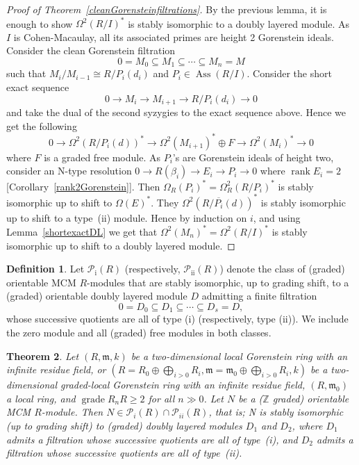 \documentclass[11pt,letterpaper]{amsart}
\newcommand{\seq}{\subseteq}
\newcommand{\x}{\xrightarrow{}}
\DeclareMathOperator{\Ass}{Ass}
\DeclareMathOperator{\gr}{grade}
\DeclareMathOperator{\rank}{rank}
\theoremstyle{plain}
\newtheorem{thm}{Theorem}[section]
\theoremstyle{definition}
\newtheorem{defi}[thm]{Definition}
\theoremstyle{remark}
\begin{document}
\begin{proof}[Proof of Theorem~\ref{cleanGorensteinfiltrations}] By the previous lemma, it is enough to show $\Omega^2(R/I)^*$ is stably isomorphic to a doubly layered module. As $I$ is Cohen-Macaulay, all its associated primes are height 2 Gorenstein ideals. Consider the clean Gorenstein filtration $$0=M_0\seq M_1\seq\cdots\seq M_n=M$$ such that $M_{i}/M_{i-1}\cong R/P_i(d_i)$ and $P_i\in\Ass(R/I)$. Consider the short exact sequence $$0\x M_{i}\x M_{i+1}\x R/P_i(d_i)\x 0$$ and take the dual of the second syzygies to the exact sequence above. Hence we get the following $$0\x\Omega^2(R/P_i(d))^*\x \Omega^2(M_{i+1})^*\oplus F\x\Omega^2(M_i)^*\x 0$$ where $F$ is a graded free module. As $P_i$'s are Gorenstein ideals of height two, consider an N-type resolution $0\x R(\beta_i)\x E_i\x P_i\x 0$ where $\rank E_i=2$[Corollary~\ref{rank2Gorenstein}]. Then $\Omega_R(P_i)^*=\Omega^2_R(R/P_i)^*$ is stably isomorphic up to shift to $\Omega(E)^*$. They $\Omega^2(R/\overline{P_i}(d))^*$ is stably isomorphic up to shift to a type~(ii) module.  Hence by induction on $i$, and using Lemma~\ref{shortexactDL} we get that $\Omega^2(M_n)^*=\Omega^2(R/I)^*$ is stably isomorphic up to shift to a doubly layered module.     
\end{proof}

\begin{defi}
    Let $\mathcal P_{\mathrm{i}}(R)$ (respectively,
$\mathcal P_{\mathrm{ii}}(R)$) denote the class of (graded) orientable
MCM $R$-modules that are stably isomorphic, up to grading
shift, to a (graded) orientable doubly layered module $D$ admitting a finite filtration
\[
0=D_0\subseteq D_1\subseteq\cdots\subseteq D_s=D,
\]
whose successive quotients are all of type (i)
(respectively, type (ii)). We include the zero module
and all (graded) free modules in both classes.
\end{defi}

\begin{thm}\label{2dimDL}
Let $(R,\mathfrak m, k)$ be a two-dimensional local Gorenstein ring with an infinite residue field, or $(R=R_0\oplus\bigoplus_{i>0}R_i,\mathfrak m=\mathfrak m_0\oplus\bigoplus_{i>0}R_i,k)$ be a two-dimensional graded-local Gorenstein ring with an infinite residue field, $(R,\mathfrak m_0)$ a local ring, and $\gr R_nR\ge 2$ for all $n\gg 0$. Let $N$ be a ($\mathbb Z$ graded) orientable MCM $R$-module.
Then $N\in\mathcal{P}_i(R)\cap \mathcal{P}_{ii}(R)$, that is; N  is stably isomorphic (up to grading shift)
to (graded) doubly layered modules $D_1$ and $D_2$,
where $D_1$ admits a filtration whose successive
quotients are all of type~(i), and $D_2$ admits
a filtration whose successive quotients are all
of type~(ii). 
\end{thm}
\end{document}
